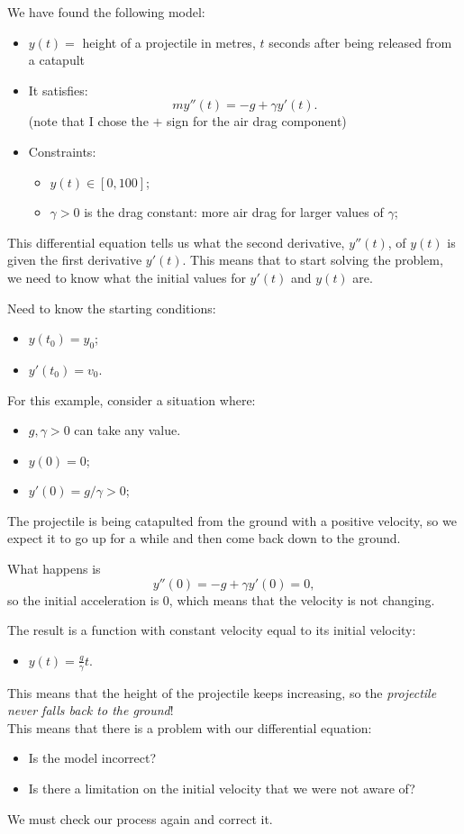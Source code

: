 \begin{example}
We have found the following model:
\begin{itemize}
	\item $y(t) = $ height of a projectile in metres, $t$ seconds after being released from a catapult
	\item It satisfies:
		$$m y''(t) =  -g + \gamma y'(t).$$
	(note that I chose the $+$ sign for the air drag component)

	\item Constraints:
	\begin{itemize}
		\item $y(t) \in [0,100]$;
		\item $\gamma >0$ is the drag constant: more air drag for larger values of $\gamma$;
	\end{itemize}
\end{itemize}	

This differential equation tells us what the second derivative, $y''(t)$, of $y(t)$ is given the first derivative $y'(t)$.
This means that to start solving the problem, we need to know what the initial values for $y'(t)$ and $y(t)$ are.

Need to know the starting conditions:
\begin{itemize}
	\item $y(t_0) = y_0$;
	\item $y'(t_0) = v_0$.
\end{itemize}

For this example, consider a situation where:
\begin{itemize}
	\item $g, \gamma >0$ can take any value.
	\item $y(0) = 0$;
	\item $y'(0) = g/\gamma > 0$;
\end{itemize}

The projectile is being catapulted from the ground with a positive velocity, so we expect it to go up for a while and then come back down to the ground.

What happens is 
$$
y''(0) = -g + \gamma y'(0) = 0,
$$
so the initial acceleration is 0, which means that the velocity is not changing.

The result is a function with constant velocity equal to its initial velocity:
\begin{itemize}
	\item $y(t) = \frac{g}{\gamma}t.$
\end{itemize}

This means that the height of the projectile keeps increasing, so the \emph{projectile never falls back to the ground}! \\

This means that there is a problem with our differential equation:
\begin{itemize}
	\item Is the model incorrect? 
	\item Is there a limitation on the initial velocity that we were not aware of?
\end{itemize}
\hfil

We must check our process again and correct it.
\end{example}
